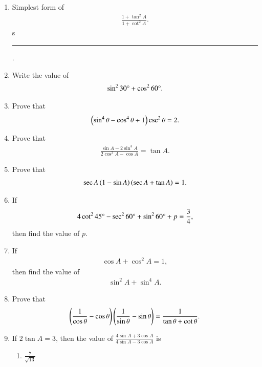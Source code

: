 \begin{enumerate}[label=\thesubsection.\arabic*,ref=\thesubsection.\theenumi,itemsep=1pt]
\item Simplest form of 
 \begin{align*}
     \frac{1 + \tan^{2}{A}}{1 + \cot^{2}{A}}
 .\end{align*}s \rule{1cm}{0.1pt}.
\hfill{}\item Write the value of
 \begin{align*}
	     \sin^{2}{30\degree} + \cos^{2}{60\degree}.
	\end{align*}
\hfill{}
\item Prove that  
        \begin{align*}
           \left(\sin^{4}{\theta} - \cos^{4}{\theta} + 1\right)\csc^{2}{\theta} = 2. 
        \end{align*}
\hfill{}
\item Prove that \begin{align*} \frac{\sin A-2 \sin^3A}{2\cos^3A-\cos A}=\tan A.\end{align*}
  \hfill{}\item Prove that \begin{align*} \sec A \left(1-\sin A\right)\left(\sec A+\tan A\right)=1.\end{align*}
%
\hfill{}\item If 
\begin{align*}
    4\cot^2 45\degree - \sec^2 60\degree + \sin^2 60\degree + p = \frac{3}{4}, 
\end{align*}
then find the value of $p$.
\hfill{}\item If 
\begin{align*}
    \cos A+ \cos^2A=1,
\end{align*}then find the value of 
\begin{align*}
\sin^2A+\sin^4A.
\end{align*}
\hfill{}\item Prove that
\begin{align*}
\left(\frac{1}{\cos\theta}-\cos\theta\right)\left(\frac{1}{\sin\theta}-\sin\theta\right) = \frac{1}{\tan\theta+\cot\theta}
.\end{align*}
%
\hfill{}\item If $2\tan A=3$, then the value of $\frac{4\sin A + 3\cos A}{4\sin A - 3\cos A}$ is
\begin{multicols}{4}
\begin{enumerate}
\item $\frac{7}{\sqrt{13}}$

\end{enumerate}
\end{multicols}
\end{enumerate}
